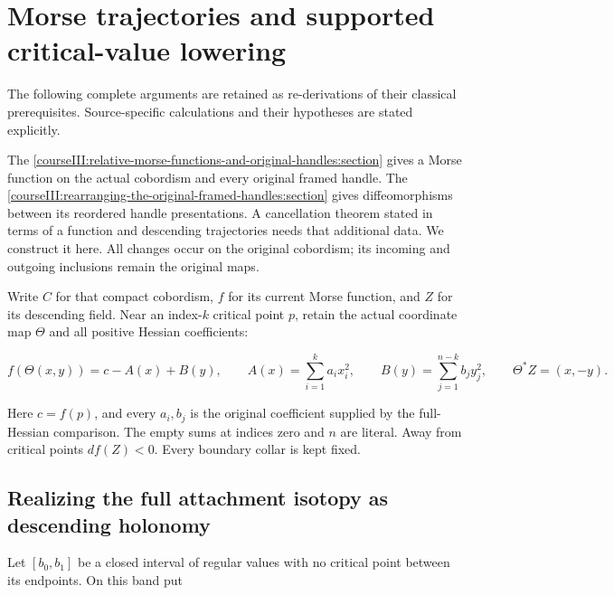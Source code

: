\section{Morse trajectories and supported critical-value lowering}\label{courseIII:morse-trajectories-and-critical-value-lowering:section}

The following complete arguments are retained as re-derivations of their classical prerequisites. Source-specific calculations and their hypotheses are stated explicitly.

The \cref{courseIII:relative-morse-functions-and-original-handles:section} gives a Morse function on the actual cobordism and every original framed handle. The \cref{courseIII:rearranging-the-original-framed-handles:section} gives diffeomorphisms between its reordered handle presentations. A cancellation theorem stated in terms of a function and descending trajectories needs that additional data. We construct it here. All changes occur on the original cobordism; its incoming and outgoing inclusions remain the original maps.

Write \(C\) for that compact cobordism, \(f\) for its current Morse function, and \(Z\) for its descending field. Near an index-\(k\) critical point \(p\), retain the actual coordinate map \(\Theta\) and all positive Hessian coefficients:

\begin{equation}
f(\Theta(x,y))=c-A(x)+B(y),\qquad
 A(x)=\sum_{i=1}^{k}a_i x_i^2,\qquad
 B(y)=\sum_{j=1}^{n-k}b_j y_j^2,\qquad
 \Theta^*Z=(x,-y).
 \label{courseIII:morse-trajectories-and-critical-value-lowering:eq:0.1}
\end{equation}

Here \(c=f(p)\), and every \(a_i,b_j\) is the original coefficient supplied by the full-Hessian comparison. The empty sums at indices zero and \(n\) are literal. Away from critical points \(df(Z)<0\). Every boundary collar is kept fixed.

\subsection{Realizing the full attachment isotopy as descending holonomy}
\label{courseIII:morse-trajectories-and-critical-value-lowering:trajectory-holonomy}

\label{courseIII:morse-trajectories-and-critical-value-lowering:section-1}\label{courseIII:trajectory-lowering:1}

Let \([b_0,b_1]\) be a closed interval of regular values with no critical point between its endpoints. On this band put

